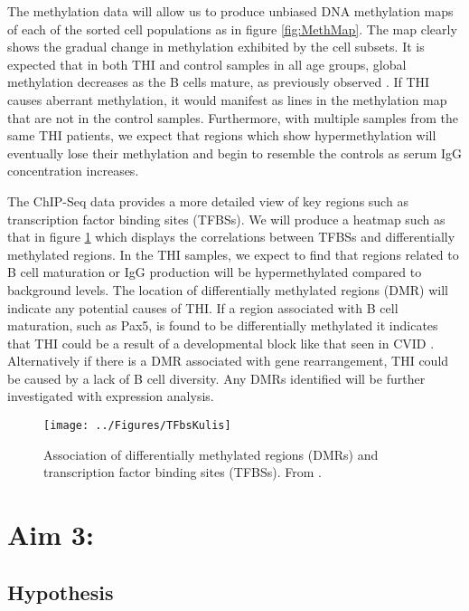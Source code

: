 \documentclass[12pt]{article}
\begin{document}
			The methylation data will allow us to produce unbiased DNA methylation maps of each of the sorted cell populations as in figure \ref{fig:MethMap}.
			The map clearly shows the gradual change in methylation exhibited by the cell subsets. 
			It is expected that in both THI and control samples in all age groups, global methylation decreases as the B cells mature, as previously observed \citep{Kulis15,Lai13,Kulis12,Shaknovich11}. 
			If THI causes aberrant methylation, it would manifest as lines in the methylation map that are not in the control samples. 
			Furthermore, with multiple samples from the same THI patients, we expect that regions which show hypermethylation will eventually lose their methylation and begin to resemble the controls as serum IgG concentration increases.
			
			The ChIP-Seq data provides a more detailed view of key regions such as transcription factor binding sites (TFBSs).
			We will produce a heatmap such as that in figure \ref{fig:TFBSheatmap} which displays the correlations between TFBSs and differentially methylated regions. 
			In the THI samples, we expect to find that regions related to B cell maturation or IgG production will be hypermethylated compared to background levels. 
			The location of differentially methylated regions (DMR) will indicate any potential causes of THI.
			If a region associated with B cell maturation, such as Pax5, is found to be differentially methylated it indicates that THI could be a result of a developmental block like that seen in CVID \citep{Tallmadge15}.
			Alternatively if there is a DMR associated with gene rearrangement, THI could be caused by a lack of B cell diversity.
			Any DMRs identified will be further investigated with expression analysis.
			
			\begin{figure}[tb]
				\centering
				\texttt{[image: ../Figures/TFbsKulis]}
				\caption{Association of differentially methylated regions (DMRs) and transcription factor binding sites (TFBSs). From \citet{Kulis15}.}
				\label{fig:TFBSheatmap}
			\end{figure}
		
	\section{Aim 3:}
	
		\subsection{Hypothesis}
			
\end{document}
